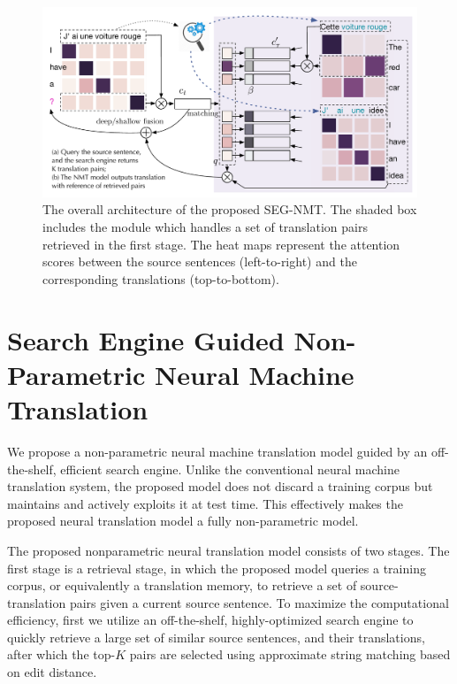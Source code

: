 \begin{figure}[hptb]
\centering
\includegraphics[width=\linewidth]{figs/seg/framework2.pdf}
\caption{\label{cp4.fig.tmnmt} The overall architecture of the proposed SEG-NMT. The shaded box includes the module which handles a set of translation pairs retrieved in the first stage. The heat maps represent the attention scores between the source sentences (left-to-right) and the corresponding translations (top-to-bottom).}
\end{figure}


\section{Search Engine Guided Non-Parametric Neural Machine Translation}

We propose a non-parametric
neural machine translation model guided by an off-the-shelf, efficient search engine. Unlike the conventional neural machine translation system, the proposed model does not discard a training corpus but maintains and actively exploits it at test time. This effectively makes the proposed neural translation model a fully non-parametric model.

The proposed nonparametric
neural translation model consists of two stages. The first stage is a retrieval stage, in which the proposed model queries a training corpus, or equivalently a translation memory, to retrieve a set of source-translation pairs given a current source sentence. To maximize the computational efficiency, first we utilize an off-the-shelf, highly-optimized search engine to quickly retrieve a large set of similar source sentences, and their translations, after which the top-$K$ pairs are selected using approximate string matching based on edit distance. 

